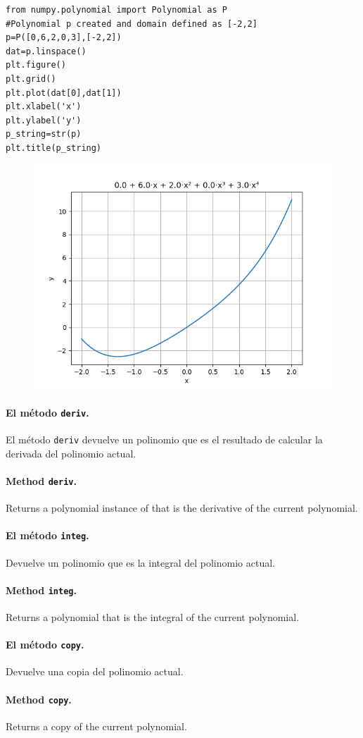 \begin{verbatim}
from numpy.polynomial import Polynomial as P
#Polynomial p created and domain defined as [-2,2]
p=P([0,6,2,0,3],[-2,2])
dat=p.linspace()
plt.figure()
plt.grid()
plt.plot(dat[0],dat[1])
plt.xlabel('x')
plt.ylabel('y')
p_string=str(p)
plt.title(p_string)
\end{verbatim}

\begin{figure}
    \centering
    \includegraphics[width=0.5\linewidth]{figuras/poli_linspace.png}
    \label{fig:poly-linespace}
\end{figure}

\begin{paracol}{2}
\paragraph{El método \texttt{deriv}.}
El método \texttt{deriv} devuelve un polinomio que es el resultado de calcular la derivada del polinomio actual.

\switchcolumn
\paragraph{Method \texttt{deriv}.}
Returns a polynomial instance of that is the derivative of the current polynomial.

\switchcolumn
\paragraph{El método \texttt{integ}.}
Devuelve un polinomio que es la integral del polinomio actual.

\switchcolumn
\paragraph{Method \texttt{integ}.}
Returns a polynomial that is the integral of the current polynomial.

\switchcolumn
\paragraph{El método \texttt{copy}.}
Devuelve una copia del polinomio actual.
\switchcolumn
\paragraph{Method \texttt{copy}.}
Returns a copy of the current polynomial.
\end{paracol}

